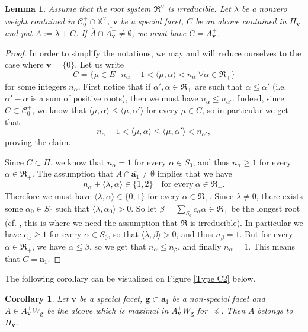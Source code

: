 \documentclass[11pt]{amsart}
\theoremstyle{plain}
\newtheorem{lem}[thm]{Lemma}
\newtheorem{coro}[thm]{Corollary}
\theoremstyle{remark}
\numberwithin{equation}{section}
\begin{document}
	
	\begin{lem}\label{lemme contained box}
		Assume that the root system $\mathfrak{R}^\vee$ is irreducible. Let $\lambda$ be a nonzero weight contained in $\overline{\mathscr{C}^+_0}\cap\mathbb{X}^\vee$, $\mathbf{v}$ be a special facet, $C$ be an alcove contained in $\Pi_\mathbf{v}$ and put $A:=\lambda+C$. If $\overline{A}\cap\overline{A^+_\mathbf{v}}\neq\emptyset$, we must have $C=A^+_\mathbf{v}$.
	\end{lem}
	\begin{proof}
		In order to simplify the notations, we may and will reduce ourselves to the case where $\mathbf{v}=\{0\}$. Let us write
		$$C=\{\mu\in E~|~n_\alpha-1<\langle\mu,\alpha\rangle<n_\alpha ~\forall\alpha\in\mathfrak{R}_+\}$$
		for some integers $n_\alpha$. First notice that if $\alpha',\alpha\in\mathfrak{R}_+$ are such that $\alpha\leq \alpha'$ (i.e.  $\alpha'-\alpha$ is a sum of positive roots), then we must have $n_\alpha\leq n_{\alpha'}$. Indeed, since $C\subset\mathscr{C}^+_0$, we know that $\langle\mu,\alpha\rangle\leq \langle\mu,\alpha'\rangle$ for every $\mu\in C$, so in particular we get that  
		$$n_\alpha-1< \langle\mu,\alpha\rangle\leq\langle\mu,\alpha'\rangle< n_{\alpha'},$$ proving the claim. 
		
		Since $C\subset\Pi$, we know that $n_\alpha=1$ for every $\alpha\in S_0$, and thus $n_\alpha\geq 1$ for every $\alpha\in\mathfrak{R}_+$. The assumption that $\overline{A}\cap\overline{\mathbf{a}_1}\neq\emptyset$ implies that we have 
		$$n_{\alpha}+\langle\lambda,{\alpha}\rangle\in\{1,2\}\quad\text{for every}~\alpha\in\mathfrak{R}_+. $$ 
		Therefore we must have $\langle\lambda,{\alpha}\rangle\in\{0,1\}$ for every $\alpha\in \mathfrak{R}_+$. Since $\lambda\neq 0$, there exists some $\alpha_0\in S_0$ such that $\langle\lambda,\alpha_0\rangle>0$. So let $\beta=\sum_{S_0}c_\alpha \alpha\in \mathfrak{R}_+$ be the longest root (cf. \cite[Chap. 6, Proposition 25]{cdi_springer_books_10_1007_978_3_540_34491_9}, this is where we need the assumption that $\mathfrak{R}$ is irreducible). In particular we have $c_\alpha\geq 1$ for every $\alpha\in S_0$, so that $\langle\lambda,\beta\rangle>0$, and thus $n_\beta=1$. But for every $\alpha\in \mathfrak{R}_+$, we have $\alpha\leq\beta$, so we get that $n_{\alpha}\leq n_\beta$, and finally $n_\alpha=1$. This means that $C=\mathbf{a}_1$.
	\end{proof}
	The following corollary can be visualized on Figure \ref{Type C2} below.
	\begin{coro}\label{lem boite}
		Let $\mathbf{v}$ be a special facet, $\mathbf{g}\subset\overline{\mathbf{a}_1}$ be a non-special facet and $A\in A^+_\mathbf{v}W_\mathbf{g}$ be the alcove which is maximal in $A^+_\mathbf{v}W_\mathbf{g}$ for $\preceq$. Then $A$ belongs to $\Pi_\mathbf{v}$.
	\end{coro}
\end{document}
